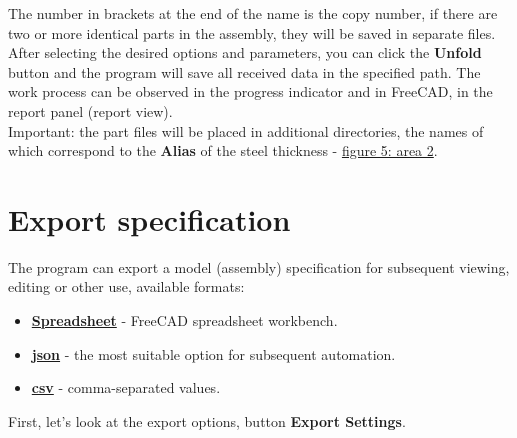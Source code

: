 \documentclass[a4paper,12pt]{article}
\begin{document}
The number in brackets at the end of the name is the copy number, if there are two or more identical parts in the assembly, they will be saved in separate files.\\

After selecting the desired options and parameters, you can click the \textbf{Unfold} button and the program will save all received data in the specified path. The work process can be observed in the progress indicator and in FreeCAD, in the report panel (report view).\\

Important: the part files will be placed in additional directories, the names of which correspond to the \textbf{Alias} of the steel thickness - \hyperref[sec:pref_sm]{figure 5: area 2}.

\pagebreak



\section{Export specification}
The program can export a model (assembly) specification for subsequent viewing, editing or other use, available formats:

\begin{itemize}
	\item \href{https://wiki.freecad.org/Spreadsheet_Workbench}{\textbf{Spreadsheet}} - FreeCAD spreadsheet workbench.
	\item \href{https://ru.wikipedia.org/wiki/JSON}{\textbf{json}} - the most suitable option for subsequent automation.
	\item \href{https://en.wikipedia.org/wiki/Comma-separated_values}{\textbf{csv}} - comma-separated values.
\end{itemize}

\begin{flushleft}First, let's look at the export options, button \textbf{Export Settings}.\end{flushleft}
\end{document}

